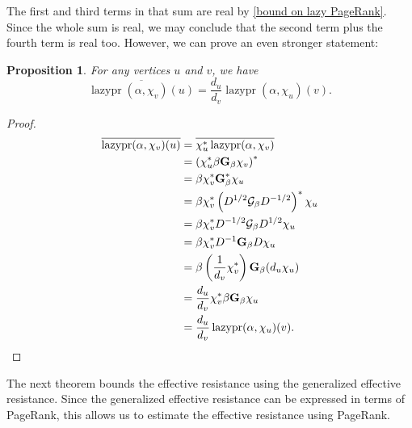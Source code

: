 \documentclass[12pt]{article}
\newtheorem{prop}[thm]{Proposition}
\theoremstyle{definition}
\DeclareMathOperator{\lazypr}{lazypr}
\newcommand{\green}{\mathcal{G}}
\newcommand{\asymgreen}{\normalfont{\textbf{G}}}
\begin{document}
The first and third terms in that sum are real by \cref{bound on lazy PageRank}. Since the whole sum is real, we may conclude that the second term plus the fourth term is real too. However, we can prove an even stronger statement:

\begin{prop}
For any vertices $u$ and $v$, we have
$$
\overline{\lazypr(\alpha, \chi_v)(u)} = \frac{d_u}{d_v} \lazypr(\alpha, \chi_u)(v).
$$
\end{prop}
\begin{proof}
\begin{align*}
\overline{\lazypr(\alpha, \chi_v)(u)} &= \overline{\chi_u^* \lazypr(\alpha, \chi_v)} \\
&= \left( \chi_u^* \beta \asymgreen_\beta \chi_v \right)^* \\
&= \beta \chi_v^* \asymgreen_\beta^* \chi_u \\
&= \beta \chi_v^* \left( D^{1/2} \green_\beta D^{-1/2} \right)^* \chi_u \\
&= \beta \chi_v^* D^{-1/2} \green_\beta D^{1/2} \chi_u \\
&= \beta \chi_v^* D^{-1} \asymgreen_\beta D \chi_u \\
&= \beta \left( \frac{1}{d_v} \chi_v^* \right) \asymgreen_\beta (d_u \chi_u) \\
&= \frac{d_u}{d_v} \chi_v^* \beta \asymgreen_\beta \chi_u \\
&= \frac{d_u}{d_v} \lazypr(\alpha, \chi_u)(v).
\end{align*}
\end{proof}

The next theorem bounds the effective resistance using the generalized effective resistance. Since the generalized effective resistance can be expressed in terms of PageRank, this allows us to estimate the effective resistance using PageRank.
\end{document}
